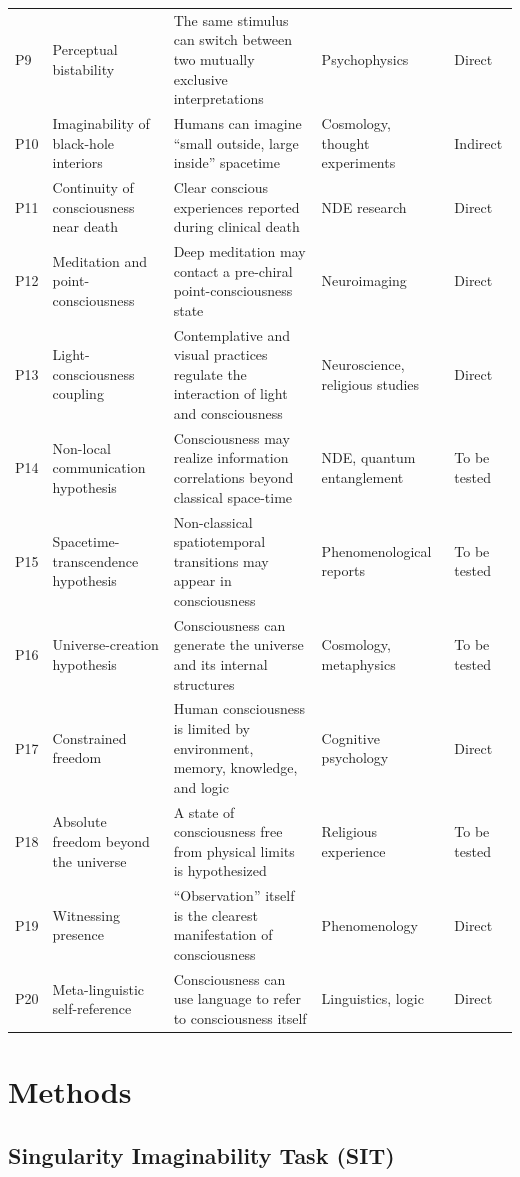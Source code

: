 \documentclass[11pt,a4paper]{article}
\begin{document}
\begin{longtable}{@{}p{0.7cm}p{3.0cm}p{4.8cm}p{2.8cm}p{2.0cm}@{}}
P9 & Perceptual bistability & The same stimulus can switch between two mutually exclusive interpretations & Psychophysics & Direct \\
P10 & Imaginability of black-hole interiors & Humans can imagine ``small outside, large inside'' spacetime & Cosmology, thought experiments & Indirect \\
P11 & Continuity of consciousness near death & Clear conscious experiences reported during clinical death & NDE research & Direct \\
P12 & Meditation and point-consciousness & Deep meditation may contact a pre-chiral point-consciousness state & Neuroimaging & Direct \\
P13 & Light-consciousness coupling & Contemplative and visual practices regulate the interaction of light and consciousness & Neuroscience, religious studies & Direct \\
P14 & Non-local communication hypothesis & Consciousness may realize information correlations beyond classical space-time & NDE, quantum entanglement & To be tested \\
P15 & Spacetime-transcendence hypothesis & Non-classical spatiotemporal transitions may appear in consciousness & Phenomenological reports & To be tested \\
P16 & Universe-creation hypothesis & Consciousness can generate the universe and its internal structures & Cosmology, metaphysics & To be tested \\
P17 & Constrained freedom & Human consciousness is limited by environment, memory, knowledge, and logic & Cognitive psychology & Direct \\
P18 & Absolute freedom beyond the universe & A state of consciousness free from physical limits is hypothesized & Religious experience & To be tested \\
P19 & Witnessing presence & ``Observation'' itself is the clearest manifestation of consciousness & Phenomenology & Direct \\
P20 & Meta-linguistic self-reference & Consciousness can use language to refer to consciousness itself & Linguistics, logic & Direct \\
\bottomrule
\end{longtable}

\section{Methods}

\subsection{Singularity Imaginability Task (SIT)}
\end{document}
